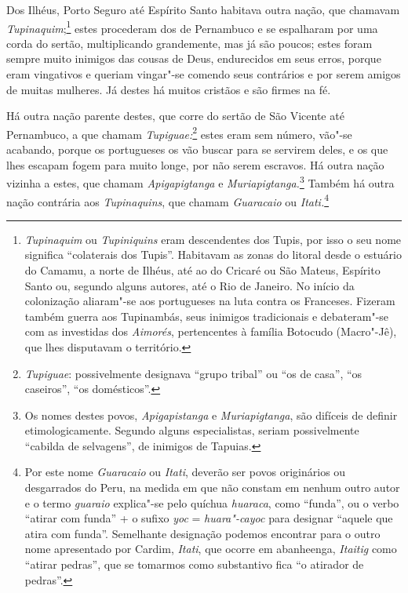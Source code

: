 \begin{linenumbers}
 Dos Ilhéus, Porto Seguro até Espírito Santo habitava outra nação, que
chamavam \textit{Tupinaquim};\footnote{ \textit{Tupinaquim} ou
\textit{Tupiniquins} eram descendentes dos Tupis, por isso o seu nome
significa ``colaterais dos Tupis''. Habitavam as zonas do litoral desde o
estuário do Camamu, a norte de Ilhéus, até ao do Cricaré ou São Mateus,
Espírito Santo ou, segundo alguns autores, até o Rio de Janeiro. No
início da colonização aliaram"-se aos portugueses na luta contra os
Franceses. Fizeram também guerra aos Tupinambás, seus inimigos
tradicionais e debateram"-se com as investidas dos \textit{Aimorés}, 
pertencentes à família Botocudo (Macro"-Jê), que lhes disputavam o
território.} estes procederam dos de Pernambuco e se
espalharam por uma corda do sertão, multiplicando grandemente, mas já
são poucos; estes foram sempre muito inimigos das cousas de Deus,
endurecidos em seus erros, porque eram vingativos e queriam vingar"-se
comendo seus contrários e por serem amigos de muitas mulheres. Já
destes há muitos cristãos e são firmes na fé.

 Há outra nação parente destes, que corre do sertão de São Vicente até
Pernambuco, a que chamam \textit{Tupiguae:}\footnote{ \textit{Tupiguae}: 
possivelmente designava ``grupo tribal'' ou ``os de casa'', ``os
caseiros'', ``os domésticos''.} estes eram sem número, vão"-se
acabando, porque os portugueses os vão buscar para se servirem deles, e
os que lhes escapam fogem para muito longe, por não serem escravos. Há
outra nação vizinha a estes, que chamam \textit{Apigapigtanga} e 
\textit{Muriapigtanga.}\footnote{ Os nomes destes povos,
\textit{Apigapistanga} e \textit{Muriapigtanga}, são difíceis de
definir etimologicamente. Segundo alguns especialistas, seriam
possivelmente ``cabilda de selvagens'', de inimigos de Tapuias.} 
Também há outra nação contrária aos \textit{Tupinaquins}, que chamam
\textit{Guaracaio} ou \textit{Itati.}\footnote{ Por este nome
\textit{Guaracaio} ou \textit{Itati}, deverão ser povos originários ou
desgarrados do Peru, na medida em que não constam em nenhum outro autor
e o termo \textit{guaraio} explica"-se pelo quíchua
\textit{huaraca}, como ``funda'', ou o verbo ``atirar com funda'' + o
sufixo \textit{yoc} = \textit{huara"-cayoc} para designar ``aquele que
atira com funda''. Semelhante designação podemos encontrar para o outro
nome apresentado por Cardim, \textit{Itati}, que ocorre em abanheenga,
\textit{Itaitig} como ``atirar pedras'', que se tomarmos como substantivo
fica ``o atirador de pedras''.} 


\end{linenumbers}
